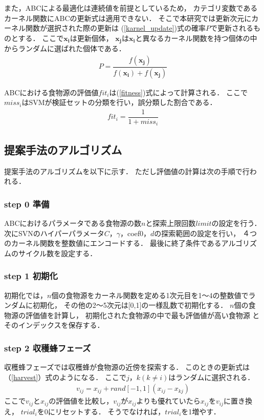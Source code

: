 また，ABCによる最適化は連続値を前提としているため，
カテゴリ変数であるカーネル関数にABCの更新式は適用できない．
そこで本研究では更新次元にカーネル関数が選択された際の更新は
(\ref{karnel_update})式の確率$P$で更新されるものとする．
ここで$\boldsymbol{x_i}$は更新個体，
$\boldsymbol{x_j}$は$\boldsymbol{x_i}$と異なるカーネル関数を持つ個体の中からランダムに選ばれた個体である．
\begin{align}
    \label{karnel_update}
   P = \dfrac{f(\boldsymbol{x_j})}{f(\boldsymbol{x_i})+f(\boldsymbol{x_j})}
\end{align}

ABCにおける食物源の評価値$fit_i$は(\ref{fitness})式によって計算される．
ここで$miss_i$はSVMが検証セットの分類を行い，誤分類した割合である．
\begin{align}
    \label{fitness}
    fit_i = \dfrac{1}{1+miss_i}
\end{align}
\subsection{提案手法のアルゴリズム}
提案手法のアルゴリズムを以下に示す．
ただし評価値の計算は次の手順で行われる．
\subsubsection*{step 0 準備}
ABCにおけるパラメータである食物源の数$n$と探索上限回数$limit$の設定を行う．
次にSVNのハイパーパラメータ$C$，$\gamma$，coef0，$d$の探索範囲の設定を行い，
４つのカーネル関数を整数値にエンコードする．
最後に終了条件であるアルゴリズムのサイクル数を設定する．
\subsubsection*{step 1 初期化}
初期化では，$n$個の食物源をカーネル関数を定める1次元目を1〜4の整数値でランダムに初期化，
その他の2〜5次元は[0,1]の一様乱数で初期化する．
$n$個の食物源の評価値を計算し，
初期化された食物源の中で最も評価値が高い食物源
とそのインデックスを保存する．
\subsubsection*{step 2 収穫蜂フェーズ}
収穫蜂フェーズでは収穫蜂が食物源の近傍を探索する．
このときの更新式は（\ref{harvest}）式のようになる．
ここで$j，k(k\neq i)$はランダムに選択される．
\begin{align}
v_{ij} = x_{ij} + rand[-1,1](x_{ij}-x_{kj})\label{harvest}
\end{align}
ここで$v_{ij}$と$x_{ij}$の評価値を比較し，$v_{ij}$が$x_{ij}$よりも優れていたら$x_{ij}$を$v_{ij}$に置き換え，
$trial_i$を0にリセットする．
そうでなければ，$trial_i$を1増やす．
